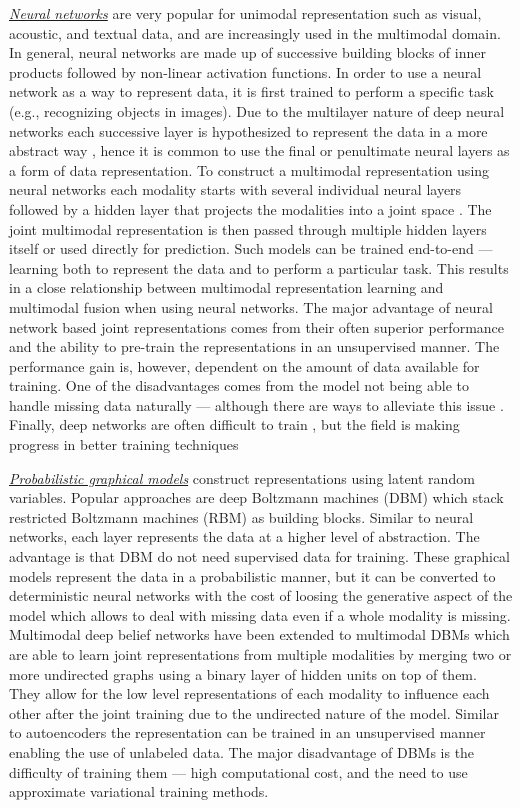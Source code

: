 \underline{\textit{Neural networks}} are very popular for unimodal representation such as visual, acoustic, and textual data, and are increasingly used in the multimodal domain.
In general, neural networks are made up of successive building blocks of inner products followed by non-linear activation functions. In order to use a neural network as a way to represent data, it is first trained to perform a specific task (e.g., recognizing objects in images). Due to the multilayer nature of deep neural networks each successive layer is hypothesized to represent the data in a more abstract way \cite{Bengio2013representation}, hence it is common to use the final or penultimate neural layers as a form of data representation. To construct a multimodal representation using neural networks each modality starts with several individual neural layers followed by a hidden layer that projects the modalities into a joint space \cite{Mroueh2015deep}. The joint multimodal representation is then passed through multiple hidden layers itself or used directly for prediction. Such models can be trained end-to-end — learning both to represent the data and to perform a particular task.
This results in a close relationship between multimodal representation learning and multimodal fusion when using neural networks.
The major advantage of neural network based joint representations comes from their often superior performance and the ability to pre-train the representations in an unsupervised
manner. The performance gain is, however, dependent on the amount of data available for training. One of the disadvantages comes from the model not being able to handle missing data naturally — although there are ways to alleviate this issue \cite{Ngiam2011}. Finally, deep networks are often difficult to train \cite{Glorot2010understanding}, but the field is making progress in better training techniques

\underline{\textit{Probabilistic graphical models}} construct representations using latent random variables. Popular approaches are deep Boltzmann machines (DBM) which stack restricted Boltzmann machines (RBM) as building blocks. Similar to neural networks, each layer represents the data at a higher level of abstraction. The advantage is that DBM do not need supervised data for training. These graphical models represent the data in a probabilistic manner, but it can be converted to deterministic neural networks with the cost of loosing the generative aspect of the model which allows to deal with missing data even if a whole modality is missing.
Multimodal deep belief networks have been extended to multimodal DBMs which are able to learn joint representations from multiple modalities by merging two or more undirected graphs using a binary layer of hidden units on top of them. They allow for the low level representations of each modality to influence each other after the joint training due to the undirected nature of the model. Similar to autoencoders the representation can be trained in an unsupervised manner enabling the use of unlabeled data. The major disadvantage of DBMs is the difficulty of training them — high computational cost, and the need to use approximate variational training methods.

